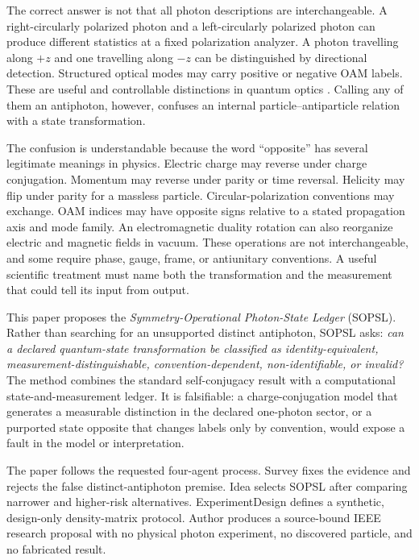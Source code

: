 \documentclass[conference]{../../../../Conference-LaTeX-template_10-17-19/IEEEtran}
\begin{document}
The correct answer is not that all photon descriptions are interchangeable. A right-circularly polarized photon and a left-circularly polarized photon can produce different statistics at a fixed polarization analyzer. A photon travelling along $+z$ and one travelling along $-z$ can be distinguished by directional detection. Structured optical modes may carry positive or negative OAM labels. These are useful and controllable distinctions in quantum optics \cite{krenn2017,forbes_andrews2021,leach2009,erhard2017}. Calling any of them an antiphoton, however, confuses an internal particle--antiparticle relation with a state transformation.

The confusion is understandable because the word ``opposite'' has several legitimate meanings in physics. Electric charge may reverse under charge conjugation. Momentum may reverse under parity or time reversal. Helicity may flip under parity for a massless particle. Circular-polarization conventions may exchange. OAM indices may have opposite signs relative to a stated propagation axis and mode family. An electromagnetic duality rotation can also reorganize electric and magnetic fields in vacuum. These operations are not interchangeable, and some require phase, gauge, frame, or antiunitary conventions. A useful scientific treatment must name both the transformation and the measurement that could tell its input from output.

This paper proposes the \emph{Symmetry-Operational Photon-State Ledger} (SOPSL). Rather than searching for an unsupported distinct antiphoton, SOPSL asks: \emph{can a declared quantum-state transformation be classified as identity-equivalent, measurement-distinguishable, convention-dependent, non-identifiable, or invalid?} The method combines the standard self-conjugacy result with a computational state-and-measurement ledger. It is falsifiable: a charge-conjugation model that generates a measurable distinction in the declared one-photon sector, or a purported state opposite that changes labels only by convention, would expose a fault in the model or interpretation.

The paper follows the requested four-agent process. Survey fixes the evidence and rejects the false distinct-antiphoton premise. Idea selects SOPSL after comparing narrower and higher-risk alternatives. ExperimentDesign defines a synthetic, design-only density-matrix protocol. Author produces a source-bound IEEE research proposal with no physical photon experiment, no discovered particle, and no fabricated result.
\end{document}
